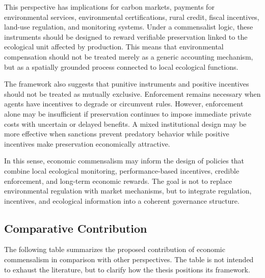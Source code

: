 This perspective has implications for carbon markets, payments for environmental services, environmental certifications, rural credit, fiscal incentives, land-use regulation, and monitoring systems. Under a commensalist logic, these instruments should be designed to reward verifiable preservation linked to the ecological unit affected by production. This means that environmental compensation should not be treated merely as a generic accounting mechanism, but as a spatially grounded process connected to local ecological functions.

The framework also suggests that punitive instruments and positive incentives should not be treated as mutually exclusive. Enforcement remains necessary when agents have incentives to degrade or circumvent rules. However, enforcement alone may be insufficient if preservation continues to impose immediate private costs with uncertain or delayed benefits. A mixed institutional design may be more effective when sanctions prevent predatory behavior while positive incentives make preservation economically attractive.

In this sense, economic commensalism may inform the design of policies that combine local ecological monitoring, performance-based incentives, credible enforcement, and long-term economic rewards. The goal is not to replace environmental regulation with market mechanisms, but to integrate regulation, incentives, and ecological information into a coherent governance structure.

\subsection{Comparative Contribution}

The following table summarizes the proposed contribution of economic commensalism in comparison with other perspectives. The table is not intended to exhaust the literature, but to clarify how the thesis positions its framework.

\renewcommand{\arraystretch}{1.3}

